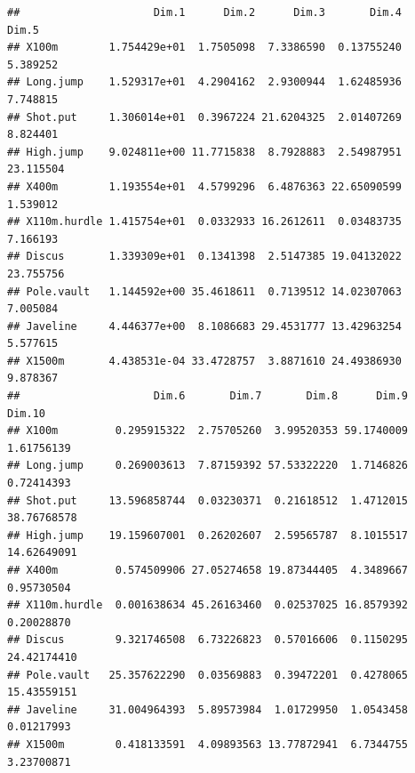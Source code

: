 \documentclass[
]{book}
\newenvironment{Shaded}{\begin{snugshade}}{\end{snugshade}}
\newcommand{\CommentTok}[1]{\textcolor[rgb]{0.56,0.35,0.01}{\textit{#1}}}
\newcommand{\NormalTok}[1]{#1}
\newcommand{\SpecialCharTok}[1]{\textcolor[rgb]{0.81,0.36,0.00}{\textbf{#1}}}
\begin{document}
\begin{verbatim}
##                     Dim.1      Dim.2      Dim.3       Dim.4     Dim.5
## X100m        1.754429e+01  1.7505098  7.3386590  0.13755240  5.389252
## Long.jump    1.529317e+01  4.2904162  2.9300944  1.62485936  7.748815
## Shot.put     1.306014e+01  0.3967224 21.6204325  2.01407269  8.824401
## High.jump    9.024811e+00 11.7715838  8.7928883  2.54987951 23.115504
## X400m        1.193554e+01  4.5799296  6.4876363 22.65090599  1.539012
## X110m.hurdle 1.415754e+01  0.0332933 16.2612611  0.03483735  7.166193
## Discus       1.339309e+01  0.1341398  2.5147385 19.04132022 23.755756
## Pole.vault   1.144592e+00 35.4618611  0.7139512 14.02307063  7.005084
## Javeline     4.446377e+00  8.1086683 29.4531777 13.42963254  5.577615
## X1500m       4.438531e-04 33.4728757  3.8871610 24.49386930  9.878367
##                     Dim.6       Dim.7       Dim.8      Dim.9      Dim.10
## X100m         0.295915322  2.75705260  3.99520353 59.1740009  1.61756139
## Long.jump     0.269003613  7.87159392 57.53322220  1.7146826  0.72414393
## Shot.put     13.596858744  0.03230371  0.21618512  1.4712015 38.76768578
## High.jump    19.159607001  0.26202607  2.59565787  8.1015517 14.62649091
## X400m         0.574509906 27.05274658 19.87344405  4.3489667  0.95730504
## X110m.hurdle  0.001638634 45.26163460  0.02537025 16.8579392  0.20028870
## Discus        9.321746508  6.73226823  0.57016606  0.1150295 24.42174410
## Pole.vault   25.357622290  0.03569883  0.39472201  0.4278065 15.43559151
## Javeline     31.004964393  5.89573984  1.01729950  1.0543458  0.01217993
## X1500m        0.418133591  4.09893563 13.77872941  6.7344755  3.23700871
\end{verbatim}

\begin{Shaded}
\end{Shaded}
\end{document}
